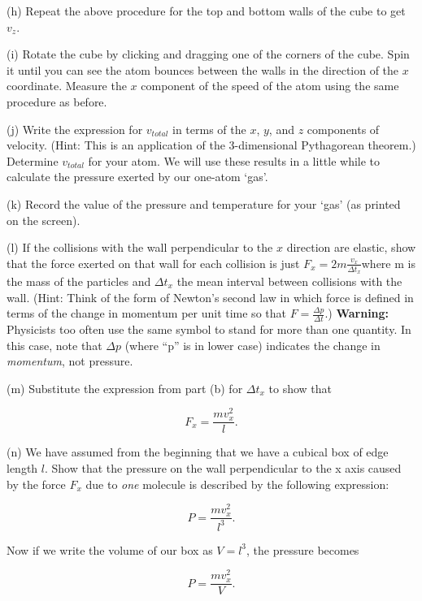 \pagebreak[2]
(h) Repeat the above procedure for the top and bottom walls of the cube to get $v_z$.
\answerspace{15mm}

(i) Rotate the cube by clicking and dragging one of the corners of the cube.
Spin it until you can see the atom bounces between the walls in the direction of
the $x$ coordinate.
Measure the $x$ component of the speed of the atom using the same procedure as before.
\answerspace{15mm}

(j) Write the
expression for \( v_{total} \) in terms of the $x$, $y$, and $z$ components
of velocity. (Hint: This is an application of the 3-dimensional Pythagorean
theorem.) Determine $v_{total}$ for your atom.
We will use these results in a little while to calculate the pressure exerted by
our one-atom `gas'.
\answerspace{15mm}

(k) Record the value of the pressure and temperature for your `gas' (as printed on the screen).
\answerspace{15mm}

(l) If the collisions with the wall perpendicular to the $x$ direction
are elastic, show that the force exerted on that wall for each collision
is just \( F_{x}=2m\frac{v_{x}}{\Delta t_{x}} \)where m is the mass
of the particles and \( \Delta t_{x} \) the mean interval between
collisions with the wall. (Hint: Think of the form of Newton's second
law in which force is defined in terms of the change in momentum per
unit time so that \( F=\frac{\Delta p}{\Delta t} \).) \textbf{Warning:} Physicists too often use the same symbol to stand
for more than one quantity. In this case, note that \( \Delta p \)
(where {}``p'' is in lower case) indicates the change in \emph{momentum},
not pressure.
\answerspace{15mm}

(m) Substitute the expression from part (b) for \( \Delta t_{x} \)
to show that 

\[
F_{x}=\frac{mv_{x}^{2}}{l}.\]

\answerspace{15mm}

(n) We have assumed from the beginning that we have a cubical box of edge length $l$. Show that the pressure on the wall perpendicular to the x axis caused by
the force \( F_{x} \) due to \emph{one} molecule is described by
the following expression:

\[
P=\frac{mv_{x}^{2}}{l^{3}}.\]

\answerspace{5mm}

\pagebreak[2]
Now if we write the volume of our box as \( V=l^{3} \), the pressure becomes

\[
P=\frac{mv_{x}^{2}}{V}.\]

